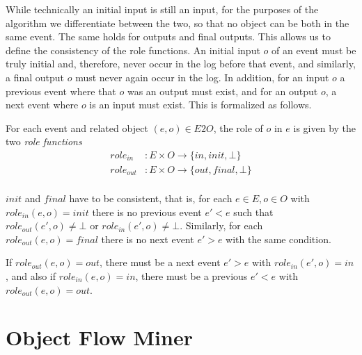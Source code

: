 While technically an initial input is still an input, for the purposes of the algorithm we differentiate between the two, so that no object can be both in the same event.
The same holds for outputs and final outputs.
This allows us to define the consistency of the role functions.
An initial input $o$ of an event must be truly initial and, therefore, never occur in the log before that event, and similarly, a final output $o$ must never again occur in the log.
In addition, for an input $o$ a previous event where that $o$ was an output must exist, and for an output $o$, a next event where $o$ is an input must exist.
This is formalized as follows.
\begin{definition}
    For each event and related object $(e, o) \in E2O$, the role of $o$ in $e$ is given by the two \emph{role functions}
    \begin{align*}
        role_{in}&: E \times O \rightarrow \{in, init, \bot\} \\
        role_{out}&: E \times O \rightarrow \{out, final, \bot\} \\
    \end{align*}

    $init$ and $final$ have to be consistent, that is,
    for each $e \in E, o\in O$ with $role_{in}(e, o) = init$ there is no previous event $e' < e$ such that $role_{out}(e', o) \not = \bot$ or $role_{in}(e', o) \not = \bot$. 
    Similarly, for each $role_{out}(e, o) = final$ there is no next event $e' > e$ with the same condition.

    If $role_{out}(e, o) = out$, there must be a next event $e' > e$ with $role_{in}(e', o) = in$, and also if $role_{in}(e, o) = in$, there must be a previous $e' < e$ with $role_{out}(e, o) = out$.

\end{definition}




\section{Object Flow Miner}



